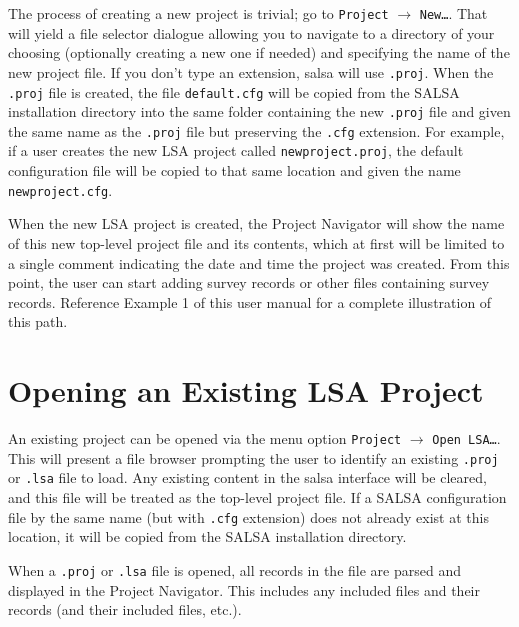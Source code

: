 The process of creating a new project is trivial; go to \texttt{Project} $\to$ \texttt{New\ldots}.  That will yield a file selector dialogue allowing you to navigate to a directory of your choosing (optionally creating a new one if needed) and specifying the name of the new project file.  If you don't type an extension, \textsf{salsa} will use \verb+.proj+.  When the \verb+.proj+ file is created, the file \verb+default.cfg+ will be copied from the SALSA installation directory into the same folder containing the new \verb+.proj+ file and given the same name as the \verb+.proj+ file but preserving the \verb+.cfg+ extension.  For example, if a user creates the new LSA project called \verb+newproject.proj+, the default configuration file will be copied to that same location and given the name \verb+newproject.cfg+.

When the new LSA project is created, the Project Navigator will show the name of this new top-level project file and its contents, which at first will be limited to a single comment indicating the date and time the project was created.  From this point, the user can start adding survey records or other files containing survey records.  Reference Example 1 of this user manual for a complete illustration of this path.


\section{Opening an Existing LSA Project}
\label{section:OpeningProject}

An existing project can be opened via the menu option \texttt{Project} $\to$ \texttt{Open LSA\ldots}.  This will present a file browser prompting the user to identify an existing \verb+.proj+ or \verb+.lsa+ file to load.  Any existing content in the \textsf{salsa} interface will be cleared, and this file will be treated as the top-level project file.  If a SALSA configuration file by the same name (but with \verb+.cfg+ extension) does not already exist at this location, it will be copied from the SALSA installation directory.

When a \verb+.proj+ or \verb+.lsa+ file is opened, all records in the file are parsed and displayed in the Project Navigator.  This includes any included files and their records (and their included files, etc.).

